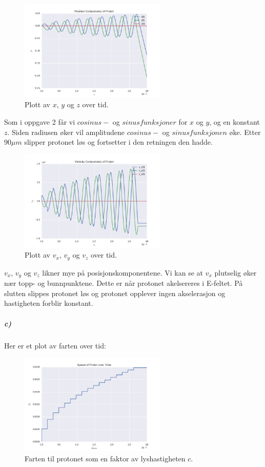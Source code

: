 \documentclass[a4paper,norsk, 10pt]{article}
\begin{document}
\begin{figure}[H]
\begin{center}
\includegraphics[width = 70mm]{opp3bPosKomp.png}
\caption{Plott av $x$, $y$ og $z$ over tid.}
\end{center}
\end{figure}

Som i oppgave 2 får vi $cosinus-$ og $sinusfunksjoner$ for $x$ og $y$, og en konstant $z$. Siden radiusen øker vil amplitudene $cosinus-$ og $sinusfunksjonen$ øke. Etter $90 \mu m$ slipper protonet løs og fortsetter i den retningen den hadde.

\begin{figure}[H]
\begin{center}
\includegraphics[width = 70mm]{opp3bVelKomp.png}
\caption{Plott av $v_x$, $v_y$ og $v_z$ over tid.}
\end{center}
\end{figure}

$v_x$, $v_y$ og $v_z$ likner mye på posisjonskomponentene. Vi kan se at $v_x$ plutselig øker nær topp- og bunnpunktene. Dette er når protonet akelsereres i E-feltet. På slutten slippes protonet løs og protonet opplever ingen akselerasjon og hastigheten forblir konstant.


\subparagraph*{c)}

Her er et plot av farten over tid:

\begin{figure}[H]
\begin{center}
\includegraphics[width = 70mm]{opp3bSpeed.png}
\caption{Farten til protonet som en faktor av lyshastigheten $c$.}
\end{center}
\end{figure}
\end{document}
